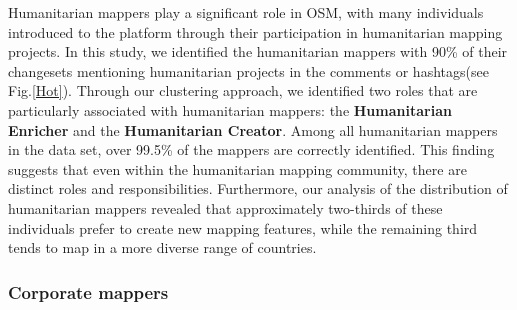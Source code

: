 \documentclass[manuscript,screen,review]{acmart}
\begin{document}
Humanitarian mappers play a significant role in OSM, with many individuals introduced to the platform through their participation in humanitarian mapping projects. In this study, we identified the humanitarian mappers with 90\% of their changesets mentioning humanitarian projects in the comments or hashtags(see Fig.\ref{Hot}). Through our clustering approach, we identified two roles that are particularly associated with humanitarian mappers: the \textbf{Humanitarian Enricher} and the \textbf{Humanitarian Creator}. Among all humanitarian mappers in the data set, over 99.5\% of the mappers are correctly identified. This finding suggests that even within the humanitarian mapping community, there are distinct roles and responsibilities. Furthermore, our analysis of the distribution of humanitarian mappers revealed that approximately two-thirds of these individuals prefer to create new mapping features, while the remaining third tends to map in a more diverse range of countries.

\subsubsection{Corporate mappers}
\end{document}
